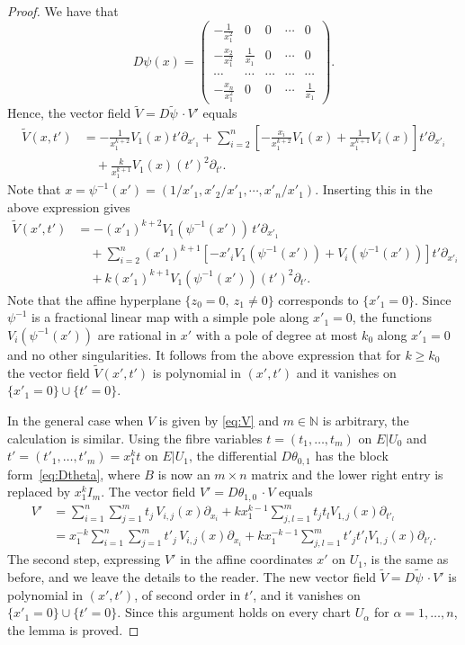 \documentclass[10pt,a4paper]{amsart}
\newcommand\N{\mathbb{N}}
\newcommand\di{\partial}
\newcommand\wt{\widetilde}
\begin{document}
\begin{proof}
We have that 
\[
	D\psi(x)=
	\begin{pmatrix}
	-\frac{1}{x_1^2} & 0 & 0 & \cdots & 0 \\
	-\frac{x_2}{x_1^2} & \frac{1}{x_1} & 0 & \cdots & 0 \\
	\cdots & \cdots & \cdots & \cdots & \cdots  \\
	-\frac{x_n}{x_1^2} & 0 & 0 & \cdots & \frac{1}{x_1}
	\end{pmatrix}.
\]
Hence, the vector field $\wt V=D\tilde\psi\,\cdotp V'$ equals
\begin{align*}
	\wt V(x,t') &= -\frac{1}{x_1^{k+2}} V_1(x) t' \di_{x'_1} 
 	+\sum_{i=2}^n \left[ - \frac{x_i}{x_1^{k+2}} V_1(x) 
	+ \frac{1}{x_1^{k+1}} V_i(x)\right] t' \di_{x'_i} \\
	&\quad + \frac{k}{x_1^{k+1}} V_1(x) (t')^2 \di_{t'}. 
\end{align*}	
Note that $x=\psi^{-1}(x')=(1/x'_1,x'_2/x'_1,\cdots,x'_n/x'_1)$.
Inserting this in the above expression gives  
\begin{align*}\label{eq:Vtilde}
	\wt V(x',t') &= -(x'_1)^{k+2} V_1(\psi^{-1}(x')) \, t' \di_{x'_1} \\ 
	&\quad	+\sum_{i=2}^n (x'_1)^{k+1}  \left[ - x'_i V_1(\psi^{-1}(x')) 
		+ V_i(\psi^{-1}(x')) \right]  t' \di_{x'_i} 	\\
	&\quad + k (x'_1)^{k+1} V_1(\psi^{-1}(x')) (t')^2 \di_{t'}.
\end{align*}
Note that the affine hyperplane $\{z_0=0,\ z_1\ne 0\}$ 
corresponds to $\{x'_1=0\}$. 
Since $\psi^{-1}$ is a fractional linear map with a simple
pole along $x'_1=0$, the functions $V_i(\psi^{-1}(x'))$ are rational
in $x'$ with a pole of degree at most $k_0$ along $x'_1=0$ 
and no other singularities. It follows from the above expression 
that for $k\ge k_0$ the vector field $\wt V(x',t')$ is polynomial in $(x',t')$
and it vanishes on $\{x'_1=0\}\cup\{t'=0\}$.

In the general case when $V$ is given by \eqref{eq:V} and $m\in\N$
is arbitrary, the calculation is similar. Using the fibre
variables $t=(t_1,\ldots,t_m)$ on $E|U_0$ and
$t'=(t'_1,\ldots,t'_m)=x_1^k t$ on $E|U_1$, 
the differential $D\theta_{0,1}$ has the block form~\eqref{eq:Dtheta},
where $B$ is now an $m\times n$ matrix and the lower right 
entry is replaced by $x_1^{k}I_m$. The vector field 
$V'=D\theta_{1,0} \, \cdotp V$ equals
\begin{align*}%
	V' &= \sum_{i=1}^n \sum_{j=1}^m t_j\, V_{i,j}(x) \di_{x_i} 
	  	 + k x_1^{k-1} \sum_{j,l=1}^m t_jt_l V_{1,j}(x) \di_{t'_l} \\
	   &= x_1^{-k} \sum_{i=1}^n \sum_{j=1}^m t'_j\, V_{i,j}(x) \di_{x_i} 
	   	 + k x_1^{-k-1} \sum_{j,l=1}^m t'_j t'_l V_{1,j}(x) \di_{t'_l}.
\end{align*}
The second step, expressing $V'$ in the affine coordinates $x'$
on $U_1$, is the same as before, and we leave 
the details to the reader. The new vector field 
$\wt V=D\tilde\psi\,\cdotp V'$ 
is polynomial in $(x',t')$, of second order in $t'$, and   
it vanishes on $\{x'_1=0\}\cup\{t'=0\}$.
Since this argument holds on every chart $U_\alpha$ for 
$\alpha=1,\ldots,n$, the lemma is proved.
\end{proof}
\end{document}
